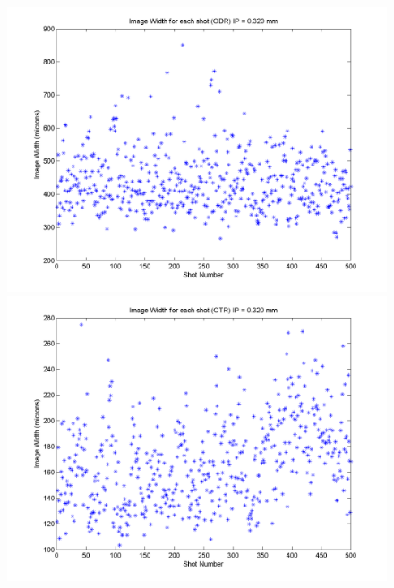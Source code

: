 \documentclass[12pt]{article}
\begin{document}
\begin{figure}
\begin{center}
\includegraphics[scale=0.5]{Figures/ImageWidth_ODR_320.PNG}
\includegraphics[scale=0.5]{Figures/ImageWidth_OTR_320.PNG}
\caption{}
\end{center}
\end{figure}
\end{document}
